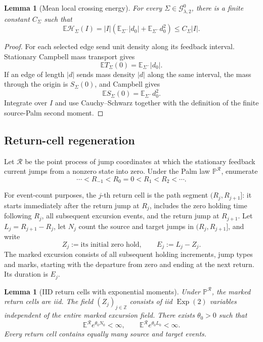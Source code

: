 \documentclass[11pt,reqno]{amsart}
\newtheorem{lemma}[theorem]{Lemma}
\theoremstyle{definition}
\theoremstyle{remark}
\numberwithin{equation}{section}
\newcommand{\E}{\mathbb E}
\newcommand{\Pp}{\mathbb P}
\begin{document}
\begin{lemma}[Mean local crossing energy]
\label{lem:mean-local-energy-prove}
For every \(\Sigma\in\mathcal G_{\lambda,2}^0\), there is a finite constant \(C_\Sigma\) such that
\begin{equation}
\E\mathcal H_\Sigma(I)
=|I|\left(\E_{\Sigma^-}|d_0|+\E_{\Sigma^-}d_0^2\right)
\le C_\Sigma|I|.
\label{eq:8.3}
\end{equation}
\end{lemma}

\begin{proof}
For each selected edge send unit density along its feedback interval.  Stationary
Campbell mass transport gives
\[
\E T_\Sigma(0)=\E_{\Sigma^-}|d_0|.
\]
If an edge of length \(|d|\) sends mass density \(|d|\) along the same interval, the
mass through the origin is \(S_\Sigma(0)\), and Campbell gives
\[
\E S_\Sigma(0)=\E_{\Sigma^-}d_0^2.
\]
Integrate over \(I\) and use Cauchy--Schwarz together with the definition of the finite source-Palm second moment.
\end{proof}

\subsection{Return-cell regeneration}

Let \(\mathcal R\) be the point process of jump coordinates at which the stationary
feedback current jumps from a nonzero state into zero.  Under the Palm law
\(\Pp^{\mathcal R}\), enumerate
\begin{equation}
\cdots<R_{-1}<R_0=0<R_1<R_2<\cdots.
\label{eq:8.4}
\end{equation}

For event-count purposes, the \(j\)-th return cell is the path segment
\((R_j,R_{j+1}]\): it starts immediately after the return jump at \(R_j\), includes the
zero holding time following \(R_j\), all subsequent excursion events, and the return jump
at \(R_{j+1}\).  Let \(L_j=R_{j+1}-R_j\), let \(N_j\) count the
source and target jumps in \((R_j,R_{j+1}]\), and write
\[
Z_j:=\text{its initial zero hold},\qquad E_j:=L_j-Z_j.
\]
The marked excursion consists of all subsequent holding increments, jump
types and marks, starting with the departure from zero and ending at the
next return.  Its duration is \(E_j\).

\begin{lemma}[IID return cells with exponential moments]
\label{lem:return-cells-prove}
Under \(\Pp^{\mathcal R}\), the marked return cells are iid.
The field \((Z_j)_{j\in\mathbb Z}\) consists of iid
\(\operatorname{Exp}(2)\) variables independent of the entire marked
excursion field.  There exists
\(\theta_0>0\) such that
\begin{equation}
\E^{\mathcal R}e^{\theta_0N_0}<\infty,
\qquad
\E^{\mathcal R}e^{\theta_0L_0}<\infty.
\label{eq:8.5}
\end{equation}
Every return cell contains equally many source and target events.
\end{lemma}
\end{document}
